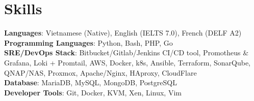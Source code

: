 \documentclass[letterpaper,11pt]{article}
\makeatletter
\newcommand{\resumeSubheading}[4]{
  \vspace{-2pt}\item
  \begin{tabular*}{0.97\textwidth}[t]{l@{\extracolsep{\fill}}r}
      \textbf{#1} & #2 \\
      \textit{\small#3} & \textit{\small #4} \\
    \end{tabular*}\vspace{-7pt}
}
\newcommand{\resumeSubHeadingListStart}{\begin{itemize}[leftmargin=0.15in, label={}]}
\newcommand{\resumeSubHeadingListEnd}{\end{itemize}}
\makeatother
\begin{document}

  
%
\section{Skills}
 \begin{itemize}[leftmargin=0.15in, label={}]
    {\item{
        \textbf{Languages}{: Vietnamese (Native), English (IELTS 7.0), French (DELF A2) }\\
        \textbf{Programming Languages}{: Python, Bash, PHP, Go} \\
        \textbf{SRE/DevOps Stack}{: Bitbucket/Gitlab/Jenkins CI/CD tool, Promotheus \& Grafana, Loki + Promtail, AWS, Docker, k8s, Ansible, Terraform, SonarQube, QNAP/NAS, Proxmox, Apache/Nginx, HAproxy, CloudFlare}\\
        \textbf{Database}{: MariaDB, MySQL, MongoDB, PostgreSQL}\\
        \textbf{Developer Tools}{: Git, Docker, KVM, Xen, Linux, Vim} \\

    }}
 \end{itemize}
\end{document}
